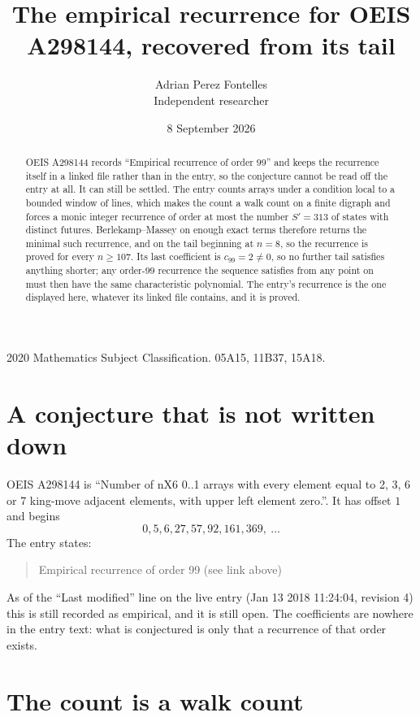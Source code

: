 \documentclass[11pt,a4paper]{article}
\title{The empirical recurrence for OEIS A298144, recovered from its tail}
\author{Adrian Perez Fontelles\\ \small Independent researcher}
\date{8 September 2026}
\theoremstyle{plain}
\theoremstyle{definition}
\begin{document}
\maketitle

\begin{abstract}
OEIS A298144 records ``Empirical recurrence of order $99$'' and keeps the recurrence itself in
a linked file rather than in the entry, so the conjecture cannot be read off the entry at all.
It can still be settled. The entry counts arrays under a condition local to a bounded window of
lines, which makes the count a walk count on a finite digraph and forces a monic integer
recurrence of order at most the number $S'=313$ of states with distinct futures. Berlekamp--Massey on
enough exact terms therefore returns the minimal such recurrence, and on the tail beginning at $n=8$, so the recurrence is proved for every $n\ge107$.
Its last coefficient is $c_{99}=2\neq0$, so no further tail satisfies anything
shorter; any order-$99$ recurrence the sequence satisfies from any point on must then have
the same characteristic polynomial. The entry's recurrence is the one displayed here, whatever
its linked file contains, and it is proved.
\end{abstract}

\noindent\small 2020 Mathematics Subject Classification. 05A15, 11B37, 15A18.\normalsize

\section{A conjecture that is not written down}

OEIS A298144 is ``Number of nX6 0..1 arrays with every element equal to 2, 3, 6 or 7 king-move adjacent elements, with upper left element zero.''. It has offset $1$ and begins
\[
0, 5, 6, 27, 57, 92, 161, 369,\ \dots
\]
The entry states:
\begin{quote}
Empirical recurrence of order 99 (see link above)
\end{quote}
As of the ``Last modified'' line on the live entry (Jan 13 2018 11:24:04, revision 4)
this is still recorded as empirical, and it is still open. The coefficients are nowhere in the
entry text: what is conjectured is only that a recurrence of that order exists.

\section{The count is a walk count}
\end{document}
